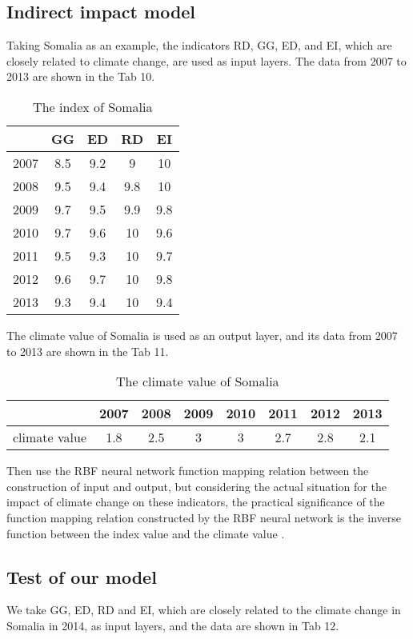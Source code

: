 \documentclass{mcmthesis}
\begin{document}
\subsection{Indirect impact model}
Taking Somalia as an example, the indicators RD, GG, ED, and EI, which are closely related to climate change, are used as input layers. The data from 2007 to 2013 are shown in the Tab 10.

\begin{table}[htbp]
\centering
\caption{The index of Somalia}
\begin{tabular}{c|cccc}   %
\hline
  & GG & ED & RD  & EI  \\
\hline
2007 & 8.5	&9.2	&9	&10 \\
2008 & 9.5	&9.4	&9.8	&10 \\
2009 & 9.7	&9.5	&9.9	&9.8 \\
2010 & 9.7	&9.6	&10	&9.6\\
2011 & 9.5	&9.3	&10	&9.7\\
2012 & 9.6	&9.7	&10	&9.8\\
2013 &9.3	&9.4	&10	&9.4 \\
\hline
\end{tabular}
\end{table}

The climate value of Somalia is used as an output layer, and its data from 2007 to 2013 are shown in the Tab 11.

\begin{table}[htbp]
\centering
\caption{The climate value of Somalia}
\begin{tabular}{c|ccccccc}   %
\hline
 & 2007	&2008	&2009	&2010	&2011	&2012	&2013 \\
\hline
climate value &1.8	&2.5	&3	&3	&2.7	&2.8	&2.1\\
\hline
\end{tabular}
\end{table}

Then use the RBF neural network function mapping relation between the construction of input and output,  but considering the actual situation for the impact of climate change on these indicators,  the practical significance of the function mapping relation constructed by the RBF neural network is the inverse function between the index value and the climate value .

\subsection{Test of our model}
We take GG, ED, RD and EI, which are closely related to the climate change in Somalia in 2014, as input layers, and the data are shown in Tab 12.
\end{document}
